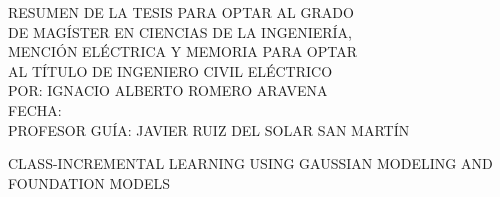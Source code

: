 \noindent\hfill
\begin{minipage}[t]{0.7\textwidth}
	RESUMEN DE LA TESIS PARA OPTAR AL GRADO \\ DE MAGÍSTER
	EN CIENCIAS DE LA INGENIERÍA, \\ MENCIÓN  ELÉCTRICA
	Y MEMORIA PARA OPTAR \\ AL TÍTULO DE 
	INGENIERO CIVIL ELÉCTRICO \\
	POR: IGNACIO ALBERTO ROMERO ARAVENA \\
	FECHA: \the\year \\
	PROFESOR GUÍA: JAVIER RUIZ DEL SOLAR SAN MARTÍN
\end{minipage}

\begin{center}
	CLASS-INCREMENTAL LEARNING USING GAUSSIAN MODELING AND FOUNDATION MODELS
\end{center}


